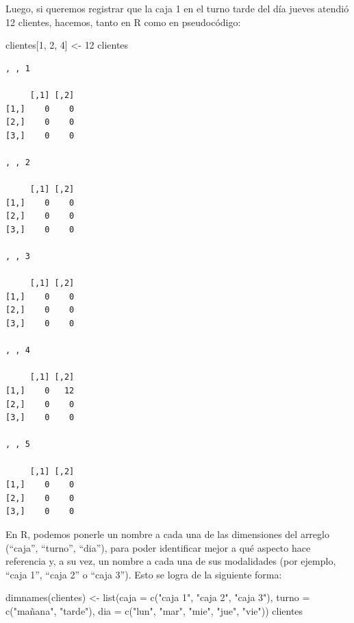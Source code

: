 \documentclass[
]{book}
\newenvironment{Shaded}{\begin{snugshade}}{\end{snugshade}}
\newcommand{\AttributeTok}[1]{\textcolor[rgb]{0.77,0.63,0.00}{#1}}
\newcommand{\DecValTok}[1]{\textcolor[rgb]{0.00,0.00,0.81}{#1}}
\newcommand{\FunctionTok}[1]{\textcolor[rgb]{0.00,0.00,0.00}{#1}}
\newcommand{\NormalTok}[1]{#1}
\newcommand{\OtherTok}[1]{\textcolor[rgb]{0.56,0.35,0.01}{#1}}
\newcommand{\StringTok}[1]{\textcolor[rgb]{0.31,0.60,0.02}{#1}}
\begin{document}
Luego, si queremos registrar que la caja 1 en el turno tarde del día jueves atendió 12 clientes, hacemos, tanto en R como en pseudocódigo:

\begin{Shaded}
\begin{Highlighting}[]
\NormalTok{clientes[}\DecValTok{1}\NormalTok{, }\DecValTok{2}\NormalTok{, }\DecValTok{4}\NormalTok{] }\OtherTok{\textless{}{-}} \DecValTok{12}
\NormalTok{clientes}
\end{Highlighting}
\end{Shaded}

\begin{verbatim}
, , 1

     [,1] [,2]
[1,]    0    0
[2,]    0    0
[3,]    0    0

, , 2

     [,1] [,2]
[1,]    0    0
[2,]    0    0
[3,]    0    0

, , 3

     [,1] [,2]
[1,]    0    0
[2,]    0    0
[3,]    0    0

, , 4

     [,1] [,2]
[1,]    0   12
[2,]    0    0
[3,]    0    0

, , 5

     [,1] [,2]
[1,]    0    0
[2,]    0    0
[3,]    0    0
\end{verbatim}

En R, podemos ponerle un nombre a cada una de las dimensiones del arreglo (``caja'', ``turno'', ``dia''), para poder identificar mejor a qué aspecto hace referencia y, a su vez, un nombre a cada una de sus modalidades (por ejemplo, ``caja 1'', ``caja 2'' o ``caja 3''). Esto se logra de la siguiente forma:

\begin{Shaded}
\begin{Highlighting}[]
\FunctionTok{dimnames}\NormalTok{(clientes) }\OtherTok{\textless{}{-}} \FunctionTok{list}\NormalTok{(}\AttributeTok{caja =} \FunctionTok{c}\NormalTok{(}\StringTok{"caja 1"}\NormalTok{, }\StringTok{"caja 2"}\NormalTok{, }\StringTok{"caja 3"}\NormalTok{),}
                           \AttributeTok{turno =} \FunctionTok{c}\NormalTok{(}\StringTok{"mañana"}\NormalTok{, }\StringTok{"tarde"}\NormalTok{),}
                           \AttributeTok{dia =} \FunctionTok{c}\NormalTok{(}\StringTok{"lun"}\NormalTok{, }\StringTok{"mar"}\NormalTok{, }\StringTok{"mie"}\NormalTok{, }\StringTok{"jue"}\NormalTok{, }\StringTok{"vie"}\NormalTok{))}
\NormalTok{clientes}
\end{Highlighting}
\end{Shaded}
\end{document}
